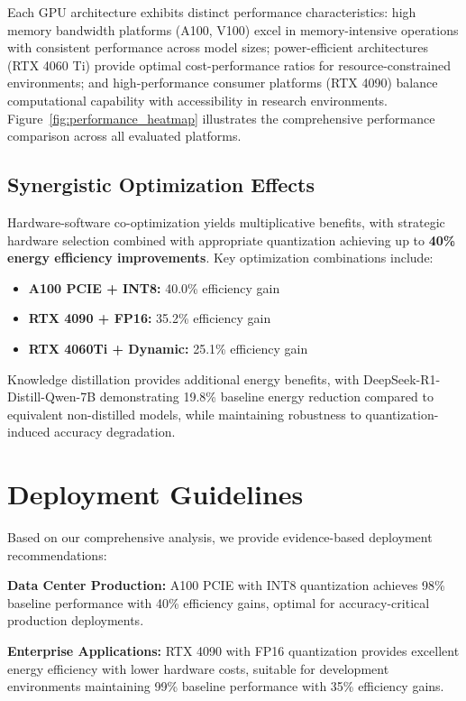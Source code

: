 \documentclass[sigconf,review]{acmart}
\begin{document}
Each GPU architecture exhibits distinct performance characteristics: high memory bandwidth platforms (A100, V100) excel in memory-intensive operations with consistent performance across model sizes; power-efficient architectures (RTX 4060 Ti) provide optimal cost-performance ratios for resource-constrained environments; and high-performance consumer platforms (RTX 4090) balance computational capability with accessibility in research environments. Figure~\ref{fig:performance_heatmap} illustrates the comprehensive performance comparison across all evaluated platforms.

\subsection{Synergistic Optimization Effects}

Hardware-software co-optimization yields multiplicative benefits, with strategic hardware selection combined with appropriate quantization achieving up to \textbf{40\% energy efficiency improvements}. Key optimization combinations include:

\begin{itemize}
\item \textbf{A100 PCIE + INT8:} 40.0\% efficiency gain
\item \textbf{RTX 4090 + FP16:} 35.2\% efficiency gain  
\item \textbf{RTX 4060Ti + Dynamic:} 25.1\% efficiency gain
\end{itemize}

Knowledge distillation provides additional energy benefits, with DeepSeek-R1-Distill-Qwen-7B demonstrating 19.8\% baseline energy reduction compared to equivalent non-distilled models, while maintaining robustness to quantization-induced accuracy degradation.

\section{Deployment Guidelines}

Based on our comprehensive analysis, we provide evidence-based deployment recommendations:

\textbf{Data Center Production:} A100 PCIE with INT8 quantization achieves 98\% baseline performance with 40\% efficiency gains, optimal for accuracy-critical production deployments.

\textbf{Enterprise Applications:} RTX 4090 with FP16 quantization provides excellent energy efficiency with lower hardware costs, suitable for development environments maintaining 99\% baseline performance with 35\% efficiency gains.
\end{document}
